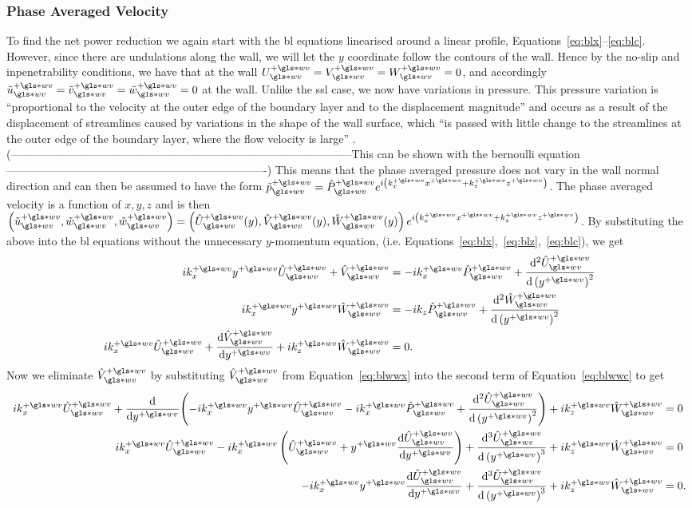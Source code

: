 \subsubsection{Phase Averaged Velocity}
To find the net power reduction we again start with the \gls{bl} equations linearised around a linear profile, Equations~\eqref{eq:blx}--\eqref{eq:blc}. However, since there are undulations along the wall, we will let the $y$ coordinate follow the contours of the wall. Hence by the no-slip and inpenetrability conditions, we have that at the wall $U\ww\pw=V\ww\pw=W\ww\pw=0$, and accordingly $\tilde{u}\ww\pw=\tilde{v}\ww\pw=\tilde{w}\ww\pw=0$ at the wall. Unlike the \gls{ssl} case, we now have variations in pressure. This pressure variation is ``proportional to the velocity at the outer edge of the boundary layer and to the displacement magnitude'' and occurs as a result of the displacement of streamlines caused by variations in the shape of the wall surface, which ``is passed with little change to the streamlines at the outer edge of the boundary layer, where the flow velocity is large'' \cite{chernyshenko2013}.
(--------------------------------------------------------------------------------------------This can be shown with the bernoulli equation ----------------------------------------------------------------------)
This means that the phase averaged pressure does not vary in the wall normal direction and can then be assumed to have the form $\tilde{p}\pw\ww=\hat{P}\pw\ww e^{i\left( k_x\pw x\pw +k_z \pw z\pw \right) }$. The phase averaged velocity is a function of  $x,y,z$ and is then $\left( \tilde{u}\pw\ww,\tilde{w}\pw\ww,\tilde{w}\pw\ww \right) = \left( \hat{U}\ww\pw(y),\hat{V}\ww\pw(y),\hat{W}\ww\pw(y) \right)e^{i\left( k_x\pw x\pw +k_z \pw z\pw \right)} $. By substituting the above into the \gls{bl} equations without the unnecessary  $y$-momentum equation, (i.e. Equations~\eqref{eq:blx},~\eqref{eq:blz},~\eqref{eq:blc}), we get
\begin{align}
	ik_x\pw y\pw \hat{U}\ww\pw+\hat{V}\ww\pw &= -ik_x\pw \hat{P}\ww\pw+\dv[2]{\hat{U}\ww\pw}{\left(y\pw\right)} \label{eq:blwwx}\\
	ik_x\pw y\pw \hat{W}\ww\pw &= -ik_z \hat{P}\ww\pw+\dv[2]{\hat{W}\pw\ww}{\left(y\pw\right)} \label{eq:blwwz}\\
	ik_x\pw \hat{U}\ww\pw + \dv{\hat{V}\ww\pw}{y\pw} + ik_z\pw \hat{W}\ww\pw &=0 \label{eq:blwwc}
.\end{align}
Now we eliminate $\hat{V}\ww\pw$ by substituting $\hat{V}\ww\pw$ from Equation~\eqref{eq:blwwx} into the second term of Equation~\eqref{eq:blwwc} to get
\begin{align}
	ik_x\pw \hat{U}\ww\pw + \dv{y\pw}(-ik_x\pw y\pw \hat{U}\pw\ww  -ik_x\pw \hat{P}\ww\pw+\dv[2]{\hat{U}\ww\pw}{\left(y\pw\right)}) + ik_z\pw \hat{W}\ww\pw &=0 \\
	ik_x\pw \hat{U}\ww\pw -ik_x\pw \left(\hat{U}\pw\ww+y\pw\dv{\hat{U}\pw\ww}{y\pw}\right)  +\dv[3]{\hat{U}\ww\pw}{\left(y\pw\right)} + ik_z\pw \hat{W}\ww\pw &=0 \\
	-ik_x\pw y\pw\dv{\hat{U}\pw\ww}{y\pw}  +\dv[3]{\hat{U}\ww\pw}{\left(y\pw\right)} + ik_z\pw \hat{W}\ww\pw &=0 \label{eq:blwwxc}
.\end{align}

